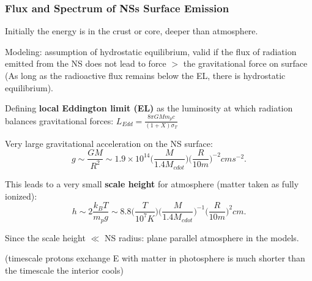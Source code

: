





\begin{frame}
\frametitle{Flux and Spectrum of NSs Surface Emission}
\begin{itemize}\scriptsize{ 
 \item Initially the energy is in the crust or core, deeper than atmosphere.
 
 \quad
 
 \item Modeling: assumption of hydrostatic equilibrium, valid if the flux of radiation emitted from the NS does not lead to force $>$ the gravitational force on surface (As long as  the radioactive flux remains below the EL, there is hydrostatic equilibrium).
 
 \quad 
 
 \item Defining {\bf local Eddington limit (EL)} as the luminosity at which radiation balances gravitational forces:
 $L_{Edd} = \frac{8 \pi G M m_p c}{(1+X)\sigma_T}$
 
 \quad
 
\item Very large gravitational acceleration on the NS surface:
$$ g \sim \frac{GM}{R^2} \sim 1.9 \times 10^{14} \Big ( \frac{M}{1.4 M_{cdot}} \Big ) \Big ( \frac{R}{10 m} \Big)^{-2} cm s^{-2}.$$

\item This leads to a very small {\bf scale height} for atmosphere (matter taken as fully ionized):
$$ h \sim 2 \frac{k_BT}{m_p g} \sim 8.8 \Big ( \frac{T}{10^7 K} \Big )  \Big ( \frac{M}{1.4 M_{cdot}} \Big )^{-1} \Big ( \frac{R}{10 m} \Big)^{2} cm.$$

\item Since the scale height $\ll$  NS radius: plane parallel atmosphere in the models.

\quad 


\item 
{\tiny (timescale protons exchange E with matter in photosphere is much shorter than the timescale the interior cools)}

} 
\end{itemize}
\end{frame}



